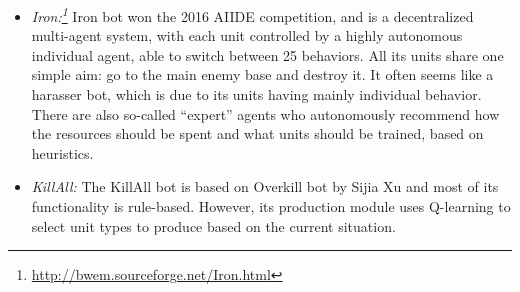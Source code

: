 \begin{itemize}
  
	\newpage
	
  \item {\em Iron:\footnote{\url{http://bwem.sourceforge.net/Iron.html}}} Iron bot won the 2016 AIIDE competition, and is a decentralized multi-agent system, with each unit controlled by a highly autonomous individual agent, able to switch between 25 behaviors. All its units share one simple aim: go to the main enemy base and destroy it. It often seems like a harasser bot, which is due to its units having mainly individual behavior. There are also so-called ``expert'' agents who autonomously recommend how the resources should be spent and what units should be trained, based on heuristics. 
  
  
  \item {\em KillAll:} The KillAll bot is based on Overkill bot by Sijia Xu and most of its functionality is rule-based. However, its production module uses Q-learning to select unit types to produce based on the current situation. 
    

\end{itemize}
